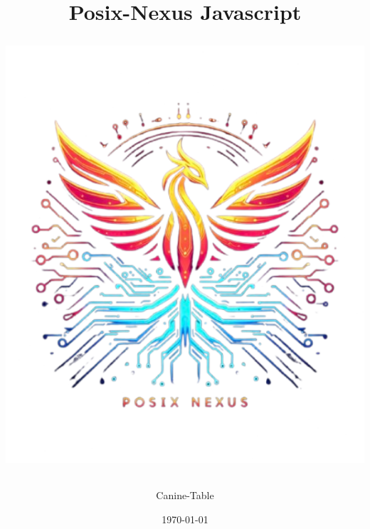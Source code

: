 \documentclass[a4paper,12pt]{article}
\begin{document}
	\label{top}
	\title{
		\hspace{48px}\textbf{Posix-Nexus Javascript}\\[10mm]
		\begin{NexMainBox}[dark, shpA,fit, width=\linewidth/2]
			\includegraphics[width=\textwidth]{img/posix-nexus.png}
		\end{NexMainBox}
	}
	\author{Canine-Table}
	\date{\today}
	\maketitle
	\newpage
	\begin{NexMainBox}[light, title=Contents, hdrB, breakable]
		\thispagestyle{plain}
		\tableofcontents
	\end{NexMainBox}
	\newpage
	
	
	
	
	
	
	
	
\end{document}
